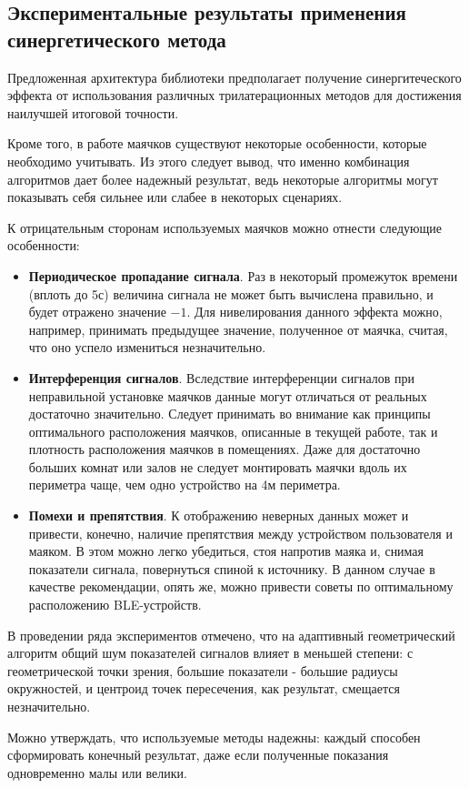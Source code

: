 \subsection{Экспериментальные результаты применения синергетического метода}

Предложенная архитектура библиотеки предполагает получение синергитеческого эффекта от использования различных трилатерационных методов для достижения наилучшей итоговой точности.

Кроме того, в работе маячков существуют некоторые особенности, которые необходимо учитывать. Из этого следует вывод, что именно комбинация алгоритмов дает более надежный результат, ведь некоторые алгоритмы могут показывать себя сильнее или слабее в некоторых сценариях.

К отрицательным сторонам используемых маячков можно отнести следующие особенности:
\begin{itemize}
    \item
    \textbf{Периодическое пропадание сигнала}. Раз в некоторый промежуток времени (вплоть до 5с) величина сигнала не может быть вычислена правильно, и будет отражено значение $-1$. Для нивелирования данного эффекта можно, например, принимать предыдущее значение, полученное от маячка, считая, что оно успело измениться незначительно.
    \item
    \textbf{Интерференция сигналов}. Вследствие интерференции сигналов при неправильной установке маячков данные могут отличаться от реальных достаточно значительно. Следует принимать во внимание как принципы оптимального расположения маячков, описанные в текущей работе, так и плотность расположения маячков в помещениях. Даже для достаточно больших комнат или залов не следует монтировать маячки вдоль их периметра чаще, чем одно устройство на 4м периметра.
    \item
    \textbf{Помехи и препятствия}. К отображению неверных данных может и привести, конечно, наличие препятствия между устройством пользователя и маяком. В этом можно легко убедиться, стоя напротив маяка и, снимая показатели сигнала, повернуться спиной к источнику. В данном случае в качестве рекомендации, опять же, можно привести советы по оптимальному расположению BLE-устройств.
\end{itemize}

В проведении ряда экспериментов отмечено, что на адаптивный геометрический алгоритм общий шум показателей сигналов влияет в меньшей степени: с геометрической точки зрения, большие показатели - большие радиусы окружностей, и центроид точек пересечения, как результат, смещается незначительно.

Можно утверждать, что используемые методы надежны: каждый способен сформировать конечный результат, даже если полученные показания одновременно малы или велики.



